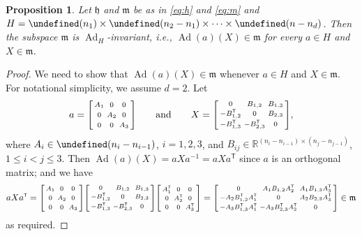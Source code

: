 \documentclass[11pt,reqno]{amsart}%
\newtheorem{proposition}[theorem]{Proposition}
\theoremstyle{definition}
\theoremstyle{remark}
\newcommand{\tp}{{\scriptscriptstyle\mathsf{T}}}
\let\O\undefined
\DeclareMathOperator{\O}{O}
\DeclareMathOperator{\Ad}{Ad}
\begin{document}
\begin{proposition}\label{prop:reductive complement}
Let $\mathfrak{h}$ and $\mathfrak{m}$ be as in \eqref{eq:h} and \eqref{eq:m} and $H =\O(n_1)\times \O(n_2-n_1)\times \dots \times \O(n-n_d)$. Then the subspace $\mathfrak{m}$ is $\Ad_H$-invariant, i.e., $\Ad(a)(X) \in \mathfrak{m}$ for every $a \in H$ and $X\in \mathfrak{m}$.
\end{proposition}
\begin{proof}
We need to show that $\Ad(a)(X) \in \mathfrak{m}$ whenever $a\in H$ and $X\in \mathfrak{m}$. For notational simplicity, we assume $d = 2$. Let
\[
a = \begin{bsmallmatrix}
A_1 & 0 & 0 \\[0.75ex]
0 & A_2 & 0 \\[0.75ex]
0 & 0 & A_3
\end{bsmallmatrix}\qquad\text{and}\qquad
X = \begin{bsmallmatrix}
0 & B_{1,2} & B_{1,3} \\
-B_{1,2}^\tp  & 0 & B_{2,3} \\
-B_{1,3}^\tp  & -B_{2,3}^\tp  & 0
\end{bsmallmatrix},
\]
where $A_i \in \O(n_i-n_{i-1})$, $i =1,2,3$, and
$B_{ij} \in \mathbb{R}^{(n_i-n_{i-1}) \times (n_j-n_{j-1})}$, $1\le i < j \le 3$.
Then $\Ad(a)(X) =a X a^{-1} = a X a^\tp $ since $a$ is an orthogonal matrix; and we have 
\[
a X a^\tp  = \begin{bsmallmatrix}
A_1 & 0 & 0 \\[0.75ex]
0 & A_2 & 0 \\[0.75ex]
0 & 0 & A_3
\end{bsmallmatrix}  \begin{bsmallmatrix}
0 & B_{1,2} & B_{1,3} \\
-B_{1,2}^\tp  & 0 & B_{2,3} \\
-B_{1,3}^\tp  & -B_{2,3}^\tp  & 0
\end{bsmallmatrix} \begin{bsmallmatrix}
A_1^\tp  & 0 & 0 \\
0 & A_2^\tp  & 0 \\
0 & 0 & A_3^\tp 
\end{bsmallmatrix} 
 = \begin{bsmallmatrix}
0 & A_1 B_{1,2} A_2^\tp  & A_1B_{1,3}A_3^\tp  \\
-A_2 B_{1,2}^\tp  A_1^\tp  & 0 & A_2B_{2,3}A_3^\tp  \\
-A_3B_{1,3}^\tp A_1^\tp  & -A_3B_{2,3}^\tp  A_2^\tp  & 0
\end{bsmallmatrix} \in \mathfrak{m}
\]
as required.
\end{proof}
\end{document}
